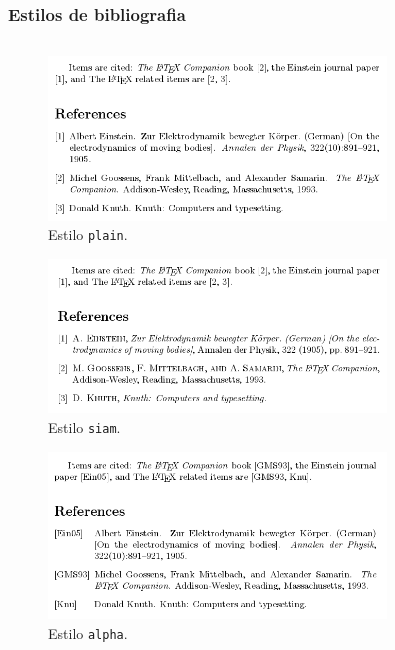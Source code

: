 \begin{frame}
\frametitle{Estilos de bibliografia}

\begin{lstlisting}[language=tex, label=lst-bibsty, caption={Escolhendo o estilo de bibliografia.}, postbreak=\mbox{$\hookrightarrow$\space}, basicstyle=\fontsize{8}{10}\selectfont\ttfamily]


\end{lstlisting}

\begin{figure}[h]
\centering
\includegraphics[width=0.8\textwidth,height=0.8\textheight,keepaspectratio]{figures/bib-plain.png}
\caption{Estilo \texttt{plain}.}
\label{fig-bib-plain}
\end{figure}

\framebreak

\begin{figure}[h]
\centering
\includegraphics[width=0.8\textwidth,height=0.8\textheight,keepaspectratio]{figures/bib-siam.png}
\caption{Estilo \texttt{siam}.}
\label{fig-bib-siam}
\end{figure}

\framebreak

\begin{figure}[h]
\centering
\includegraphics[width=0.8\textwidth,height=0.8\textheight,keepaspectratio]{figures/bib-alpha.png}
\caption{Estilo \texttt{alpha}.}
\label{fig-bib-alpha}
\end{figure}


\end{frame}
